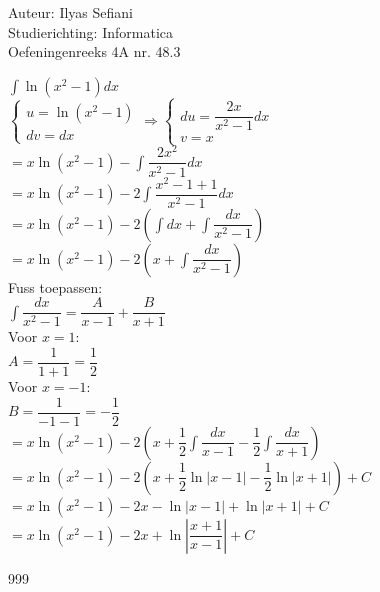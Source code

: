 \documentclass[a4paper]{article}
\begin{document}
\noindent \large Auteur: Ilyas Sefiani \\
\noindent \large Studierichting: Informatica\\
\noindent \large Oefeningenreeks 4A nr. 48.3\\

\medskip

\normalsize

$\displaystyle\int \ln(x^2-1)dx$\\

$\left \{
\begin{array}{l}
u=\ln(x^2-1) \\
dv=dx
\end{array}
\right .
\Rightarrow
\left \{
\begin{array}{l}
du=\dfrac{2x}{x^2-1}dx \\
v=x
\end{array}
\right .$\\

$=x\ln(x^2-1) - \displaystyle\int \dfrac{2x^2}{x^2-1}dx$\\

$=x\ln(x^2-1) - 2\displaystyle\int \dfrac{x^2-1+1}{x^2-1}dx$\\

$=x\ln(x^2-1) - 2\left(\displaystyle\int dx + \displaystyle\int \dfrac{dx}{x^2-1}\right)$\\

$=x\ln(x^2-1) - 2\left(x + \displaystyle\int \dfrac{dx}{x^2-1}\right)$\\

Fuss toepassen:\\

$\displaystyle\int \dfrac{dx}{x^2-1} = \dfrac{A}{x-1} + \dfrac{B}{x+1}$\\

Voor $x = 1$:\\

$A = \dfrac{1}{1+1} = \dfrac{1}{2}$\\

Voor $x = -1$:\\

$B = \dfrac{1}{-1-1} = -\dfrac{1}{2}$\\

$=x\ln(x^2-1) - 2\left(x + \dfrac{1}{2}\displaystyle\int \dfrac{dx}{x-1}-\dfrac{1}{2}\displaystyle\int \dfrac{dx}{x+1}\right)$\\

$=x\ln(x^2-1) - 2\left(x + \dfrac{1}{2}\ln|x-1|-\dfrac{1}{2}\ln|x+1|\right) + C$\\

$=x\ln(x^2-1) - 2x -\ln|x-1|+\ln|x+1| + C$\\

$=x\ln(x^2-1) - 2x +\ln\left|\dfrac{x+1}{x-1}\right| + C$\\

\begin{thebibliography}{999}
\end{thebibliography}
\end{document}
